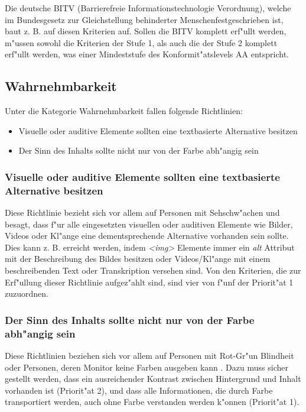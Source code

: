 \documentclass[a4paper,bibtotoc,oneside]{scrbook}
\begin{document}
Die deutsche BITV (Barrierefreie Informationstechnologie Verordnung), welche im \glqq Bundesgesetz zur Gleichstellung behinderter Menschen\grqq  festgeschrieben ist, baut z. B. auf diesen Kriterien auf. Sollen die BITV komplett erf"ullt werden, m"ussen sowohl die Kriterien der Stufe 1, als auch die der Stufe 2 komplett erf"ullt werden, was einer Mindeststufe des Konformit"atslevels AA entspricht. \cite[S. 38-39]{barr_webd}

\subsection{Wahrnehmbarkeit}
Unter die Kategorie Wahrnehmbarkeit fallen folgende Richtlinien: 

\begin{itemize}
\item Visuelle oder auditive Elemente sollten eine textbasierte Alternative besitzen\cite[Abschnitt 6.1]{wcag1}
\item Der Sinn des Inhalts sollte nicht nur von der Farbe abh"angig sein \cite[Abschnitt 6.2]{wcag1}
\end{itemize}

\subsubsection{Visuelle oder auditive Elemente sollten eine textbasierte Alternative besitzen}
Diese Richtlinie bezieht sich vor allem auf Personen mit Sehschw"achen und besagt, dass f"ur alle eingesetzten visuellen oder auditiven Elemente wie Bilder, Videos oder Kl"ange eine dementsprechende Alternative vorhanden sein sollte. Dies kann z. B. erreicht werden, indem \emph{<img>} Elemente immer ein \emph{alt} Attribut mit der Beschreibung des Bildes besitzen oder Videos/Kl"ange mit einem beschreibenden Text oder Transkription versehen sind. Von den Kriterien, die  zur Erf"ullung dieser Richtlinie aufgez"ahlt sind, sind vier von f"unf der Priorit"at 1 zuzuordnen. \cite[Abschnitt 6.1]{wcag1}

\subsubsection{Der Sinn des Inhalts sollte nicht nur von der Farbe abh"angig sein}
Diese Richtlinien beziehen sich vor allem auf Personen mit Rot-Gr"un Blindheit oder Personen, deren Monitor keine Farben ausgeben kann \cite[S. 41]{barr_webd}. Dazu muss sicher gestellt werden, dass ein ausreichender Kontrast zwischen Hintergrund und Inhalt vorhanden ist (Priorit"at 2), und dass alle Informationen, die durch Farbe transportiert werden, auch ohne Farbe verstanden werden k"onnen (Priorit"at 1). \cite[Abschnitt 6.1]{wcag1}
\end{document}
